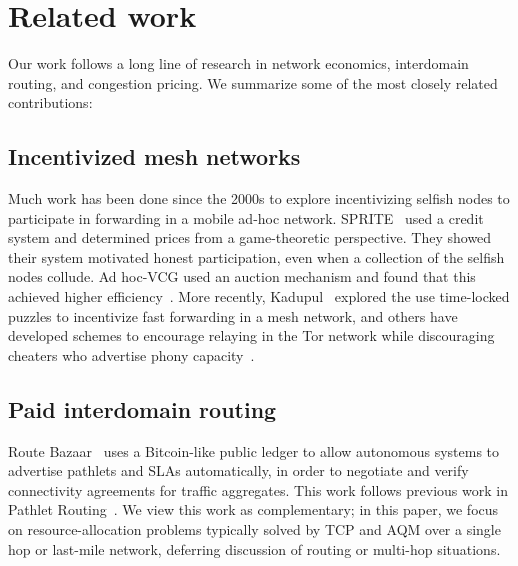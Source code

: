 \section{Related work}
\label{sec:related}

Our work follows a long line of research in network economics,
interdomain routing, and congestion pricing.  We summarize some of the
most closely related contributions:

\subsection{Incentivized mesh networks}
Much work has been done since the 2000s to explore incentivizing selfish nodes to participate in forwarding in a mobile ad-hoc network.
SPRITE~\cite{zhong03} used a credit system and determined prices from a game-theoretic perspective. They showed their system motivated honest participation, even when a collection of the selfish nodes collude. Ad hoc-VCG used an auction mechanism
and found that this achieved higher efficiency~\cite{anderegg03}. More recently, Kadupul~\cite{kadupul15} explored the use time-locked puzzles to incentivize fast forwarding in a mesh network,
and others have developed schemes to encourage relaying in the Tor network while discouraging cheaters who
advertise phony capacity~\cite{torpath14, onions14}.

\subsection{Paid interdomain routing}

Route Bazaar~\cite{routebazaar15} uses a Bitcoin-like public ledger to
allow autonomous systems to advertise pathlets and SLAs
automatically, in order to negotiate and verify connectivity
agreements for traffic aggregates. This work follows previous work in
Pathlet Routing~\cite{pathlet09}. We view this work as complementary;
in this paper, we focus on resource-allocation problems typically
solved by TCP and AQM over a single hop or last-mile network,
deferring discussion of routing or multi-hop situations.

